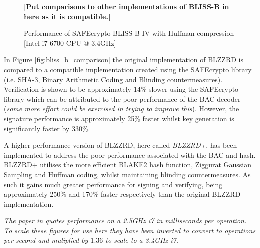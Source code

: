\pgfplotsset{compat=1.13,width=12cm,height=8cm}
\begin{figure}[ht!]
\centering
{}

\textbf{[Put comparisons to other implementations of BLISS-B in here as it is compatible.]}
\caption{Performance of SAFEcrypto BLISS-B-IV with Huffman compression [Intel i7 6700 CPU @ 3.4GHz]}
\label{fig:bliss_b_entropy_comparison}
\end{figure}


\clearpage
In Figure \ref{fig:bliss_b_comparison} the original implementation of BLZZRD \cite{markku_blzzrd} is compared to a compatible implementation created using the SAFEcrypto library (i.e. SHA-3, Binary Arithmetic Coding and Blinding countermeasures). Verification is shown to be approximately 14\% slower using the SAFEcrypto library which can be attributed to the poor performance of the BAC decoder (\textit{some more effort could be exercised in trying to improve this}). However, the signature performance is approximately 25\% faster whilst key generation is significantly faster by 330\%.

A higher performance version of BLZZRD, here called \textit{BLZZRD+}, has been implemented to address the poor performance associated with the BAC and hash. BLZZRD+ utilises the more efficient BLAKE2 hash function, Ziggurat Gaussian Sampling and Huffman coding, whilst maintaining blinding countermeasures. As such it gains much greater performance for signing and verifying, being approximately 250\% and 170\% faster respectively than the original BLZZRD implementation.

\textit{The paper in \cite{markku_blzzrd} quotes performance on a 2.5GHz i7 in milliseconds per operation. To scale these figures for use here they have been inverted to convert to operations per second and muliplied by $1.36$ to scale to a 3.4GHz i7.}

